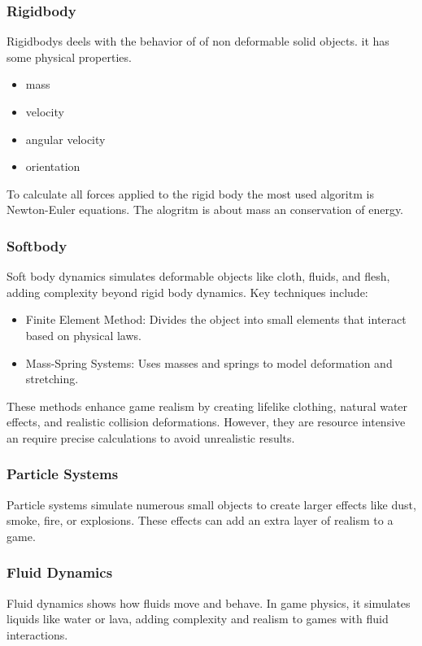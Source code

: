 \documentclass{projdoc}
\begin{document}
\subsubsection{Rigidbody}
Rigidbodys deels with the behavior of of non deformable solid objects. it has some physical properties.
\begin{itemize}
	\item mass
	\item velocity
	\item angular velocity
	\item orientation
\end{itemize}
To calculate all forces applied to the rigid body the most used algoritm is Newton-Euler equations. The alogritm is about mass an conservation of energy.

\subsubsection{Softbody}
Soft body dynamics simulates deformable objects like cloth, fluids, and flesh, adding complexity beyond rigid body dynamics. Key techniques include:
\begin{itemize}
	\item Finite Element Method: Divides the object into small elements that interact based on physical laws.
	\item Mass-Spring Systems: Uses masses and springs to model deformation and stretching.
\end{itemize}
These methods enhance game realism by creating lifelike clothing, natural water effects, and realistic collision deformations. However, they are resource intensive an require precise calculations to avoid unrealistic results.

\subsubsection{Particle Systems}
Particle systems simulate numerous small objects to create larger effects like dust, smoke, fire, or explosions. These effects can add an extra layer of realism to a game.

\subsubsection{Fluid Dynamics}
Fluid dynamics shows how fluids move and behave. In game physics, it simulates liquids like water or lava, adding complexity and realism to games with fluid interactions.
\end{document}
